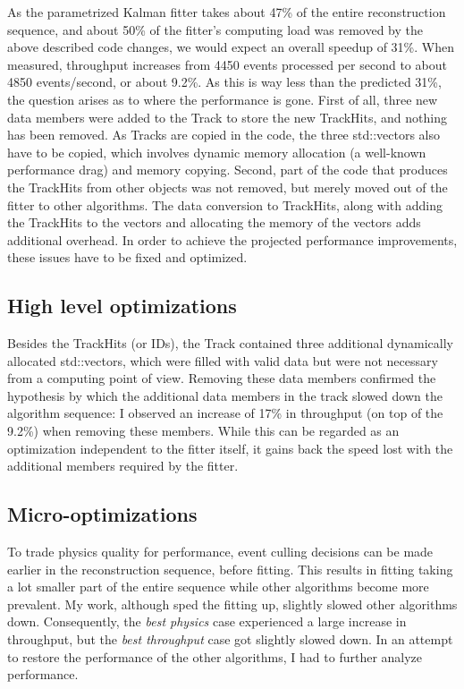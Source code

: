 \documentclass[12pt]{article}
\begin{document}
As the parametrized Kalman fitter takes about 47\% of the entire reconstruction sequence, and about 50\% of the fitter's computing load was removed by the above described code changes, we would expect an overall speedup of 31\%. When measured, throughput increases from 4450 events processed per second to about 4850 events/second, or about 9.2\%. As this is way less than the predicted 31\%, the question arises as to where the performance is gone. First of all, three new data members were added to the Track to store the new TrackHits, and nothing has been removed. As Tracks are copied in the code, the three std::vectors also have to be copied, which involves dynamic memory allocation (a well-known performance drag) and memory copying. Second, part of the code that produces the TrackHits from other objects was not removed, but merely moved out of the fitter to other algorithms. The data conversion to TrackHits, along with adding the TrackHits to the vectors and allocating the memory of the vectors adds additional overhead. In order to achieve the projected performance improvements, these issues have to be fixed and optimized.


\subsection{High level optimizations}

Besides the TrackHits (or IDs), the Track contained three additional dynamically allocated std::vectors, which were filled with valid data but were not necessary from a computing point of view. Removing these data members confirmed the hypothesis by which the additional data members in the track slowed down the algorithm sequence: I observed an increase of 17\% in throughput (on top of the 9.2\%) when removing these members. While this can be regarded as an optimization independent to the fitter itself, it gains back the speed lost with the additional members required by the fitter.


\subsection{Micro-optimizations}

To trade physics quality for performance, event culling decisions can be made earlier in the reconstruction sequence, before fitting. This results in fitting taking a lot smaller part of the entire sequence while other algorithms become more prevalent. My work, although sped the fitting up, slightly slowed other algorithms down. Consequently, the \textit{best physics} case experienced a large increase in throughput, but the \textit{best throughput} case got slightly slowed down. In an attempt to restore the performance of the other algorithms, I had to further analyze performance.
\end{document}
